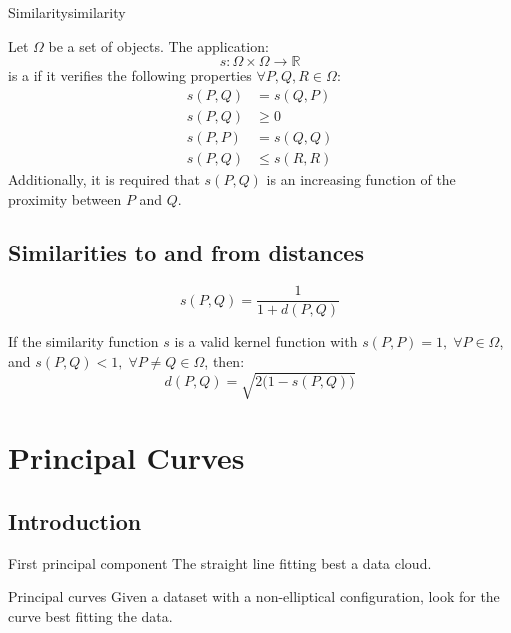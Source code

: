 \begin{definition}{Similarity}{similarity}

	Let $\Omega$ be a set of objects. The application:
	\begin{equation*}
		s: \Omega \times \Omega \to \mathds{R}
	\end{equation*}
	is a  if it verifies the following properties $\forall P, Q, R \in \Omega$:
	\begin{align*}
		s(P, Q) & = s(Q, P) \tag{symmetry}    \\
		s(P, Q) & \geq 0 \tag{non-negativity} \\
		s(P, P) & = s(Q, Q)                   \\
		s(P, Q) & \leq s(R, R)
	\end{align*}
	Additionally, it is required that $s(P, Q)$ is an increasing function of
	the proximity between $P$ and $Q$.
\end{definition}

\subsection{Similarities to and from distances}
\begin{equation*}
	s(P, Q) = \frac{1}{1 + d(P, Q)}
\end{equation*}

If the similarity function $s$ is a valid kernel function with $s(P, P) = 1,\;\forall P\in\Omega$,
and $s(P, Q) < 1,\;\forall P \neq Q \in \Omega$, then:
\begin{equation*}
	d(P, Q) = \sqrt{2\bigl(1 - s(P, Q)\bigr)}
\end{equation*}

\clearpage
\section{Principal Curves}

\subsection{Introduction}

\begin{definition}{First principal component}{}
	The straight line fitting best a data cloud.
\end{definition}

\begin{problem}{Principal curves}{}
Given a dataset with a non-elliptical configuration,
look for the curve best fitting the data.
\end{problem}

